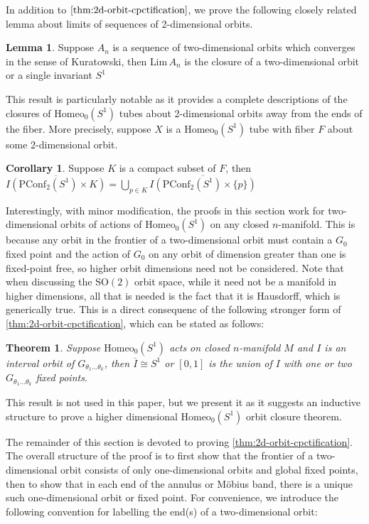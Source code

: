 \documentclass[10pt, oneside]{article}
\newcommand{\SO}[1][2]{\text{SO}(#1)}
\newcommand{\homeo}[1][S^1]{\text{Homeo}_0(#1)}
\newcommand{\cl}[1]{\overline{#1}}
\newcommand{\pconf}[2][S^1]{\text{PConf}_{#2}(#1)}
\newcommand{\klim}[1]{\text{Lim}\,#1}
\newtheorem{thm}{Theorem}[section]
\theoremstyle{definition}
\newtheorem{lem}{Lemma}[section]
\newtheorem{cor}{Corollary}[section]
\theoremstyle{definition}
\begin{document}
In addition to $\cref{thm:2d-orbit-cpctification}$, we prove the following closely related lemma about limits of sequences of 2-dimensional orbits.

\begin{lem}\label{lem:seq-of-annuli}
    Suppose $A_n$ is a sequence of two-dimensional orbits which converges in the sense of Kuratowski, then $\klim A_n$ is the closure of a two-dimensional orbit or a single invariant $S^1$
\end{lem}

This result is particularly notable as it provides a complete descriptions of the closures of $\homeo$ tubes about 2-dimensional orbits away from the ends of the fiber. More precisely, suppose $X$ is a $\homeo$ tube with fiber $F$ about some 2-dimensional orbit. 

\begin{cor}\label{cor:cpct-tube-boundary}
    Suppose $K$ is a compact subset of $F$, then $\cl{I(\pconf{2}\times K)} = \bigcup_{p\in K} \cl{I(\pconf{2}\times \{p\})}$
\end{cor}

Interestingly, with minor modification, the proofs in this section work for two-dimensional orbits of actions of $\homeo$ on any closed $n$-manifold. This is because any orbit in the frontier of a two-dimensional orbit must contain a $G_0$ fixed point and the action of $G_0$ on any orbit of dimension greater than one is fixed-point free, so higher orbit dimensions need not be considered. Note that when discussing the $\SO$ orbit space, while it need not be a manifold in higher dimensions, all that is needed is the fact that it is Hausdorff, which is generically true. This is a direct consequenc of the following stronger form of \cref{thm:2d-orbit-cpctification}, which can be stated as follows:

\begin{thm}
    Suppose $\homeo$ acts on closed $n$-manifold $M$ and $I$ is an interval orbit of $G_{\theta_1\dots\theta_k}$, then $\cl{I}\cong S^1$ or $[0,1]$ is the union of $I$ with one or two $G_{\theta_1\dots\theta_k}$ fixed points.
\end{thm}

This result is not used in this paper, but we present it as it suggests an inductive structure to prove a higher dimensional $\homeo$ orbit closure theorem.

The remainder of this section is devoted to proving \cref{thm:2d-orbit-cpctification}. The overall structure of the proof is to first show that the frontier of a two-dimensional orbit consists of only one-dimensional orbits and global fixed points, then to show that in each end of the annulus or M\"{o}bius band, there is a unique such one-dimensional orbit or fixed point. For convenience, we introduce the following convention for labelling the end(s) of a two-dimensional orbit:
\end{document}
